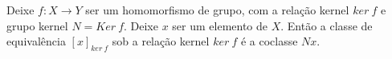 \begin{stat}
  Deixe $f: X\to Y$ ser um homomorfismo de grupo, com a relação kernel $ker\ f$ e grupo kernel $N=Ker\ f$. Deixe $x$ ser um elemento de $X$. Então a classe de equivalência $[x]_{ker\ f}$ sob a relação kernel $ker\ f$ é a coclasse $Nx$.
\end{stat}





















